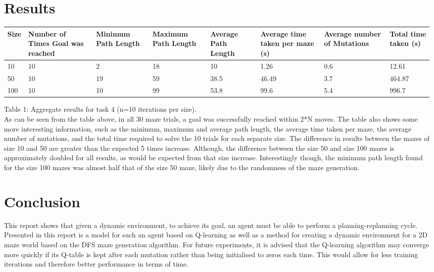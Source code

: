\documentclass{article}
\begin{document}
    \section{Results}\label{sec:results}

        \begin{tabular}{ | m{1cm} | m{5em}| m{2cm} | m{2cm} | m{2cm} | m{2cm} | m{2cm} | m{2cm} | } 
	\hline
	Size & Number of Times Goal was reached & Minimum Path Length & Maximum Path Length & Average Path Length & Average time taken
	per maze (s) & Average number of Mutations & Total time taken (s)\\
	  \hline
	  10 & 10 & 2 & 18 & 10 & 1.26 & 0.6 & 12.61 \\ 
	  \hline
	  50 & 10 & 19 & 59 & 38.5 & 46.49 & 3.7 & 464.87 \\ 
	  \hline
	  100 & 10 & 10 & 99 & 53.8 & 99.6 & 5.4 & 996.7 \\ 
	  \hline
	\end{tabular}
	Table 1: Aggregate results for task 4 (n=10 iterations per size).
	\vspace*{1cm} \\
	As can be seen from the table above, in all 30 maze trials, a goal was successfully reached within 2*N moves. The table also shows some more interesting information, such as the minimum, maximum and average path length, the average time taken per maze, the average number of mutations, and the total time required to solve the 10 trials for each separate size. The difference in results between the mazes of size 10 and 50 are greater than the expected 5 times increase. Although, the difference between the size 50 and size 100 mazes is approximately doubled for all results, as would be expected from that size increase. Interestingly though, the minimum path length found for the size 100 mazes was almost half that of the size 50 maze, likely due to the randomness of the maze generation.

    
	\section{Conclusion}\label{sec:conclusion}
	This report shows that given a dynamic environment, to achieve its goal, an agent must be able to perform a planning-replanning cycle. Presented in this report is a model for such an agent based on Q-learning as well as a method for creating a dynamic environment for a 2D maze world based on the DFS maze generation algorithm. For future experiments, it is advised that the Q-learning algorithm may converge more quickly if its Q-table is kept after each mutation rather than being initialised to zeros each time. This would allow for less training iterations and therefore better performance in terms of time. 


    
    
\end{document}
